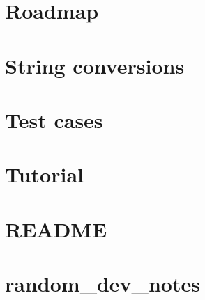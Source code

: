 \let\mypdfximage\pdfximage\def\pdfximage{\immediate\mypdfximage}\documentclass[twoside]{book}
\newcommand{\+}{\discretionary{\mbox{\scriptsize$\hookleftarrow$}}{}{}}
\begin{document}
\chapter{Roadmap}
\label{md__c___users__u_s_e_r_source_repos_bzareva_star_wars_universe_0_1_doctest_doc_markdown_roadmap}

\chapter{String conversions}
\label{md__c___users__u_s_e_r_source_repos_bzareva_star_wars_universe_0_1_doctest_doc_markdown_stringification}

\chapter{Test cases}
\label{md__c___users__u_s_e_r_source_repos_bzareva_star_wars_universe_0_1_doctest_doc_markdown_testcases}

\chapter{Tutorial}
\label{md__c___users__u_s_e_r_source_repos_bzareva_star_wars_universe_0_1_doctest_doc_markdown_tutorial}

\chapter{README}
\label{md__c___users__u_s_e_r_source_repos_bzareva_star_wars_universe_0_1_doctest__r_e_a_d_m_e}

\chapter{random\+\_\+dev\+\_\+notes}
\label{md__c___users__u_s_e_r_source_repos_bzareva_star_wars_universe_0_1_doctest_scripts_random_dev_notes}

\end{document}
